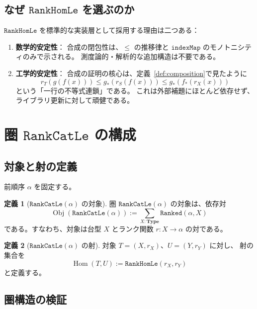 \documentclass[11pt,a4paper,ja=standard]{bxjsarticle}
\theoremstyle{definition}
\newtheorem{definition}{定義}[section]
\newcommand{\Hom}{\operatorname{Hom}}
\newcommand{\Obj}{\operatorname{Obj}}
\newcommand{\Type}{\mathbf{Type}}
\newcommand{\RankHomLe}{\mathtt{RankHomLe}}
\newcommand{\RankCatLe}{\mathtt{RankCatLe}}
\newcommand{\Ranked}{\mathtt{Ranked}}
\begin{document}
\subsection{なぜ $\RankHomLe$ を選ぶのか}

$\RankHomLe$ を標準的な実装層として採用する理由は二つある：

\begin{enumerate}
\item \textbf{数学的安定性}：
合成の閉包性は、$\le$ の推移律と $\mathtt{indexMap}$ のモノトニシティのみで示される。
測度論的・解析的な追加構造は不要である。

\item \textbf{工学的安定性}：
合成の証明の核心は、定義~\ref{def:composition}で見たように
\[
  r_T(g(f(x))) \le g_*(r_S(f(x))) \le g_*(f_*(r_X(x)))
\]
という「一行の不等式連鎖」である。
これは外部補題にほとんど依存せず、ライブラリ更新に対して頑健である。
\end{enumerate}

\section{圏 \texorpdfstring{$\RankCatLe$}{RankCatLe} の構成}

\subsection{対象と射の定義}

前順序 $\alpha$ を固定する。

\begin{definition}[$\RankCatLe(\alpha)$ の対象]
圏 $\RankCatLe(\alpha)$ の対象は、依存対
\[
  \Obj(\RankCatLe(\alpha)) := \sum_{X : \Type} \Ranked(\alpha, X)
\]
である。すなわち、対象は台型 $X$ とランク関数 $r : X \to \alpha$ の対である。
\end{definition}

\begin{definition}[$\RankCatLe(\alpha)$ の射]
対象 $T = (X, r_X)$、$U = (Y, r_Y)$ に対し、
射の集合を
\[
  \Hom(T, U) := \RankHomLe(r_X, r_Y)
\]
と定義する。
\end{definition}

\subsection{圏構造の検証}
\end{document}
